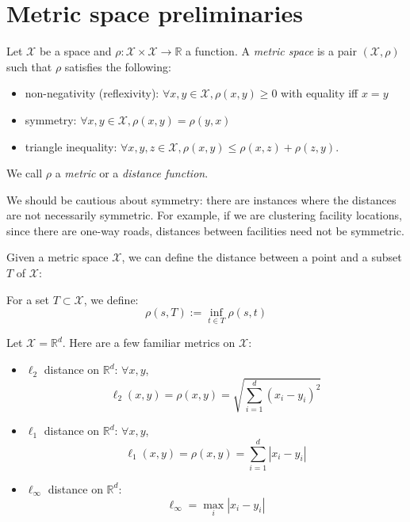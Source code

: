 \section{Metric space preliminaries}
\begin{definition}
Let $\mathcal{X}$ be a space and $\rho: \mathcal{X} \times \mathcal{X}
\to \mathbb{R}$ a function. A \emph{metric space} is a pair
$(\mathcal{X},\rho)$ such that $\rho$ satisfies the following:
\begin{itemize}
\item non-negativity (reflexivity): $\forall x,y \in \mathcal{X},
  \rho(x,y) \ge 0$ with equality iff $x=y$ 
\item symmetry: $\forall x,y \in \mathcal{X}, \rho(x,y) = \rho(y,x)$ 
\item triangle inequality: $\forall x,y,z \in \mathcal{X}, \rho(x,y)
  \le \rho(x,z) + \rho(z,y)$. 
\end{itemize}
We call $\rho$ a \emph{metric} or a \emph{distance function}.

\end{definition}

We should be cautious about symmetry: there are instances where
the distances are not necessarily symmetric. For example, if we are
clustering facility locations, since there are one-way roads,
distances between facilities need not be symmetric.

Given a metric space $\mathcal{X}$, we can define the distance between
a point and a subset $T$ of $\mathcal{X}$: 
\begin{definition}
For a set $T \subset \mathcal{X}$, we define: 
\[\rho(s,T) := \inf_{t\in T} \rho(s,t)\]
\end{definition}

\begin{example} Let $\mathcal{X} = \mathbb{R}^d$. Here are a few
familiar metrics on $\mathcal{X}$:
\begin{itemize}
\item $\ell_2$ distance on $\mathbb{R}^d$: $\forall x,y$,
\[\ell_2(x,y) = \rho(x,y) = \sqrt{\sum_{i=1}^d (x_i - y_i)^2}\] 
\item $\ell_1$  distance on $\mathbb{R}^d$: $\forall x,y$, 
\[\ell_1(x,y) = \rho(x,y) = \sum_{i=1}^d |x_i - y_i|\]
\item $\ell_\infty$ distance on $\mathbb{R}^d$: 
\[\ell_{\infty} = \max_i |x_i - y_i|\]
\end{itemize}
\end{example}

